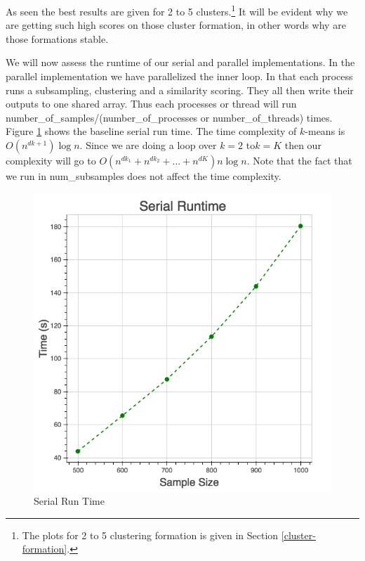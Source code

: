 \documentclass[10pt,twocolumn,letterpaper]{article}
\begin{document}
As seen the best results are given for 2 to 5 clusters.\footnote{The plots for 2 to 5 clustering formation is given in Section \ref{cluster-formation}.} It will be evident why we are getting such high scores on those cluster
formation, in other words why are those formations stable. 

We will now assess the runtime of our serial and parallel implementations.
In the parallel implementation we have parallelized the inner loop.
In that each process runs a subsampling, clustering and a similarity
scoring. They all then write their outputs to one shared array. Thus
each processes or thread will run number\_of\_samples/(number\_of\_processes
or number\_of\_threads) times. Figure \ref{fig:Serial-Run-Time} shows
the baseline serial run time. The time complexity of $k$-means is $O(n^{dk+1})\log n$.
Since we are doing a loop over $k=2$ to$ k=K$ then our complexity will
go to $O(n^{dk_1}+n^{dk_2}+ ... +n^{dK})n \log n$. Note that the fact
that we run in num\_subsamples does not affect the time complexity. 

\begin{figure}[htbp] 
\begin{center}
\includegraphics[scale=0.65]{figure/serial.png}
\end{center}
\caption{\label{fig:Serial-Run-Time}Serial Run Time}
\end{figure}
\end{document}
